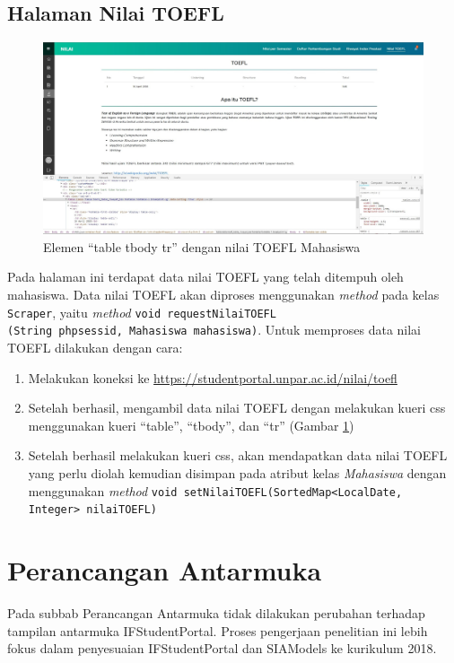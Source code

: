 \subsection{Halaman Nilai TOEFL}
		\begin{figure}[H]
			\centering
			\includegraphics[scale=0.3]{Gambar/Nilai_toefl_css}
			\caption{Elemen ``table tbody tr'' dengan nilai TOEFL Mahasiswa}
			\label{pic:nilai_toefl_css}
		\end{figure}
Pada halaman ini terdapat data nilai TOEFL yang telah ditempuh oleh mahasiswa. Data nilai TOEFL akan diproses menggunakan \textit{method} pada kelas \texttt{Scraper}, yaitu \textit{method} \texttt{void requestNilaiTOEFL\\(String phpsessid, Mahasiswa mahasiswa)}. Untuk memproses data nilai TOEFL dilakukan dengan cara:
\begin{enumerate}
	\item Melakukan koneksi ke \url{https://studentportal.unpar.ac.id/nilai/toefl}
	\item Setelah berhasil, mengambil data nilai TOEFL dengan melakukan kueri css menggunakan kueri ``table'', ``tbody'', dan ``tr'' (Gambar \ref{pic:nilai_toefl_css})
	\item Setelah berhasil melakukan kueri css, akan mendapatkan data nilai TOEFL yang perlu diolah kemudian disimpan pada atribut kelas \textit{Mahasiswa} dengan menggunakan \textit{method} \texttt{void setNilaiTOEFL(SortedMap<LocalDate, Integer> nilaiTOEFL)}
\end{enumerate}

\section{Perancangan Antarmuka}
Pada subbab Perancangan Antarmuka tidak dilakukan perubahan terhadap tampilan antarmuka IFStudentPortal. Proses pengerjaan penelitian ini lebih fokus dalam penyesuaian IFStudentPortal dan SIAModels ke kurikulum 2018.